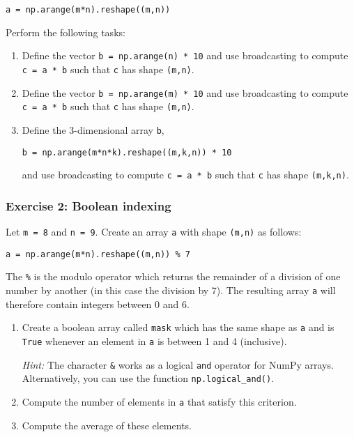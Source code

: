 \documentclass[10pt]{scrartcl}
\begin{document}
\begin{verbatim}
a = np.arange(m*n).reshape((m,n))
\end{verbatim}

Perform the following tasks:

\begin{enumerate}
\def\labelenumi{\arabic{enumi}.}
\item
  Define the vector \texttt{b\ =\ np.arange(n)\ *\ 10} and use
  broadcasting to compute \texttt{c\ =\ a\ *\ b} such that \texttt{c}
  has shape \texttt{(m,n)}.
\item
  Define the vector \texttt{b\ =\ np.arange(m)\ *\ 10} and use
  broadcasting to compute \texttt{c\ =\ a\ *\ b} such that \texttt{c}
  has shape \texttt{(m,n)}.
\item
  Define the 3-dimensional array \texttt{b},

\begin{verbatim}
b = np.arange(m*n*k).reshape((m,k,n)) * 10
\end{verbatim}

  and use broadcasting to compute \texttt{c\ =\ a\ *\ b} such that
  \texttt{c} has shape \texttt{(m,k,n)}.
\end{enumerate}

    \hypertarget{exercise-2-boolean-indexing}{%
\subsubsection{Exercise 2: Boolean
indexing}\label{exercise-2-boolean-indexing}}

Let \texttt{m\ =\ 8} and \texttt{n\ =\ 9}. Create an array \texttt{a}
with shape \texttt{(m,n)} as follows:

\begin{verbatim}
a = np.arange(m*n).reshape((m,n)) % 7
\end{verbatim}

The \texttt{\%} is the modulo operator which returns the remainder of a
division of one number by another (in this case the division by 7). The
resulting array \texttt{a} will therefore contain integers between 0 and
6.

\begin{enumerate}
\def\labelenumi{\arabic{enumi}.}
\item
  Create a boolean array called \texttt{mask} which has the same shape
  as \texttt{a} and is \texttt{True} whenever an element in \texttt{a}
  is between 1 and 4 (inclusive).

  \emph{Hint:} The character \texttt{\&} works as a logical \texttt{and}
  operator for NumPy arrays. Alternatively, you can use the function
  \texttt{np.logical\_and()}.
\item
  Compute the number of elements in \texttt{a} that satisfy this
  criterion.
\item
  Compute the average of these elements.
\end{enumerate}
\end{document}
